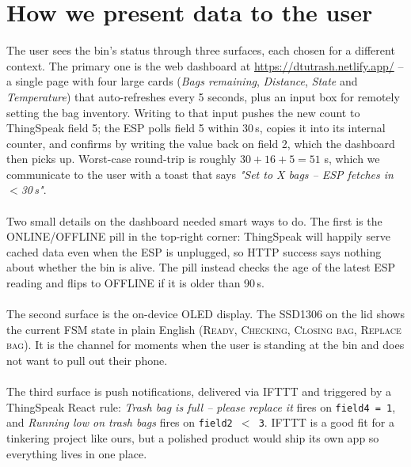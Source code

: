 \documentclass{article}
\begin{document}
\fi

\section{How we present data to the user}
\label{sec:presentation}

The user sees the bin's status through three surfaces, each chosen for a different context. The primary one is the web dashboard at \url{https://dtutrash.netlify.app/} -- a single page with four large cards (\emph{Bags remaining}, \emph{Distance}, \emph{State} and \emph{Temperature}) that auto-refreshes every 5 seconds, plus an input box for remotely setting the bag inventory. Writing to that input pushes the new count to ThingSpeak field 5; the ESP polls field 5 within 30\,s, copies it into its internal counter, and confirms by writing the value back on field 2, which the dashboard then picks up. Worst-case round-trip is roughly $30 + 16 + 5 = 51$ s, which we communicate to the user with a toast that says \emph{"Set to X bags -- ESP fetches in $<$30\,s"}.
\\ \\
Two small details on the dashboard needed smart ways to do. The first is the ONLINE/OFFLINE pill in the top-right corner: ThingSpeak will happily serve cached data even when the ESP is unplugged, so HTTP success says nothing about whether the bin is alive. The pill instead checks the age of the latest ESP reading and flips to OFFLINE if it is older than 90\,s. 
\\ \\
The second surface is the on-device OLED display. The SSD1306 on the lid shows the current FSM state in plain English (\textsc{Ready}, \textsc{Checking}, \textsc{Closing bag}, \textsc{Replace bag}). It is the channel for moments when the user is standing at the bin and does not want to pull out their phone.
\\ \\
The third surface is push notifications, delivered via IFTTT and triggered by a ThingSpeak React rule: \emph{Trash bag is full -- please replace it} fires on \texttt{field4 = 1}, and \emph{Running low on trash bags} fires on \texttt{field2 $<$ 3}. IFTTT is a good fit for a tinkering project like ours, but a polished product would ship its own app so everything lives in one place.

\ifdefined\mainfile\else
\end{document}
